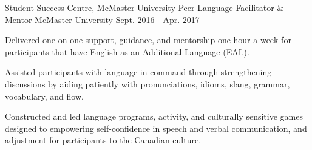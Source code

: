 \begin{cventries}
    

 \cventry
 {Student Success Centre, McMaster University} %
    {Peer Language Facilitator \& Mentor} %
    {McMaster University} %
    {Sept. 2016 - Apr. 2017}
    {
      \begin{cvitems} %
        \item {Delivered one-on-one support, guidance, and mentorship one-hour a week for participants that have English-as-an-Additional Language (EAL).}
        \item {Assisted participants with language in command through strengthening discussions by aiding patiently with pronunciations, idioms, slang, grammar, vocabulary, and flow.}
        \item {Constructed and led language programs, activity, and culturally sensitive games designed to empowering self-confidence in speech and verbal communication, and  adjustment for participants to the Canadian culture.}
      \end{cvitems}
    }





\end{cventries}
